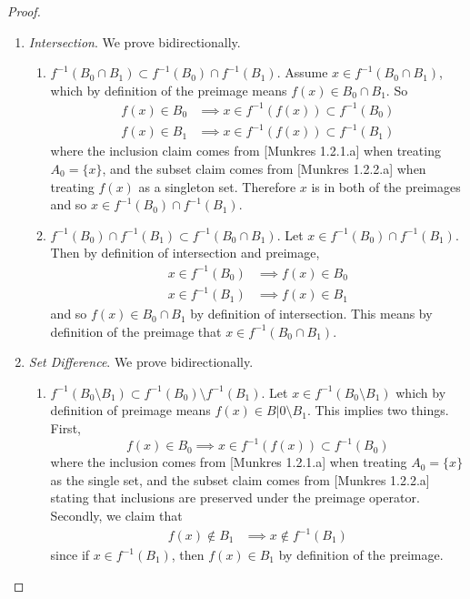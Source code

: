 \documentclass{article}
\begin{document}
\begin{proof}
\begin{enumerate}
        \item \textit{Intersection}. We prove bidirectionally. 
        \begin{enumerate}
          \item $f^{-1} (B_0 \cap B_1) \subset f^{-1} (B_0) \cap f^{-1} (B_1)$. Assume $x \in f^{-1} (B_0 \cap B_1)$, which by definition of the preimage means $f(x) \in B_0 \cap B_1$. So 
            \begin{align}
              f(x) \in B_0 & \implies x \in f^{-1} (f(x)) \subset f^{-1} (B_0) \\
              f(x) \in B_1 & \implies x \in f^{-1} (f(x)) \subset f^{-1} (B_1)
            \end{align}
            where the inclusion claim comes from [Munkres 1.2.1.a] when treating $A_0 = \{x\}$, and the subset claim comes from [Munkres 1.2.2.a] when treating $f(x)$ as a singleton set. Therefore $x$ is in both of the preimages and so $x \in f^{-1} (B_0) \cap f^{-1} (B_1)$. 
          \item $f^{-1} (B_0) \cap f^{-1} (B_1) \subset f^{-1} (B_0 \cap B_1)$. Let $x \in f^{-1} (B_0) \cap f^{-1} (B_1)$. Then by definition of intersection and preimage, 
            \begin{align}
              x \in f^{-1} (B_0) & \implies f(x) \in B_0 \\
              x \in f^{-1} (B_1) & \implies f(x) \in B_1 
            \end{align} 
            and so $f(x) \in B_0 \cap B_1$ by definition of intersection. This means by definition of the preimage that $x \in f^{-1}(B_0 \cap B_1)$. 
        \end{enumerate}

        \item \textit{Set Difference}. We prove bidirectionally. 
        \begin{enumerate}
          \item $f^{-1} (B_0 \setminus B_1) \subset f^{-1} (B_0) \setminus f^{-1} (B_1)$. Let $x \in f^{-1}(B_0 \setminus B_1)$ which by definition of preimage means $f(x) \in B|0 \setminus B_1$. This implies two things. First, 
            \begin{equation}
              f(x) \in B_0 \implies x \in f^{-1} (f(x)) \subset f^{-1} (B_0)
            \end{equation}
            where the inclusion comes from [Munkres 1.2.1.a] when treating $A_0 = \{x\}$ as the single set, and the subset claim comes from [Munkres 1.2.2.a] stating that inclusions are preserved under the preimage operator. Secondly, we claim that  
            \begin{align}
              f(x) \not\in B_1 & \implies x \not\in f^{-1} (B_1)
            \end{align}
            since if $x \in f^{-1} (B_1)$, then $f(x) \in B_1$ by definition of the preimage. 


\end{enumerate}
\end{enumerate}
\end{proof}
\end{document}
